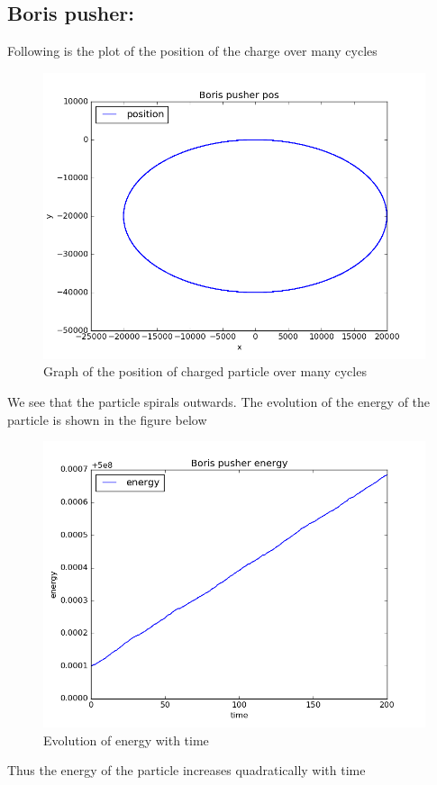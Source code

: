 \documentclass[11pt, a4paper]{article}
\begin{document}
\subsection{Boris pusher:}
Following is the plot of the position of the charge over many cycles
\begin{figure}[H]
 \centering
 \includegraphics[scale = 0.5]{Boris_pos_1.png}
 \caption{Graph of the position of charged particle over many cycles}
\end{figure}
We see that the particle spirals outwards.
\newpage
The evolution of the energy of the particle is shown in the figure below
\begin{figure}[H]
 \centering
 \includegraphics[scale = 0.5]{Boris_energy_1.png}
 \caption{Evolution of energy with time}
\end{figure}
Thus the energy of the particle increases quadratically with time
\end{document}
